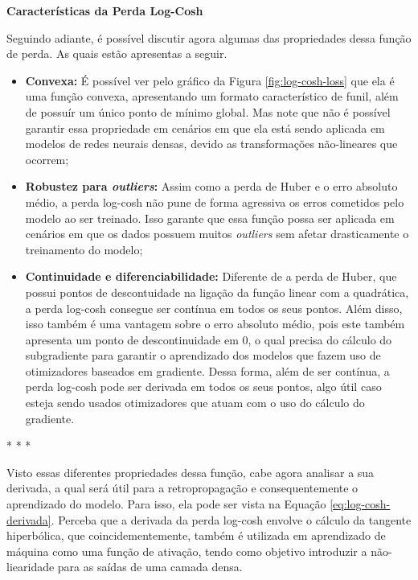 \textbf{Características da Perda Log-Cosh}
\vspace{1em}

Seguindo adiante, é possível discutir agora algumas das propriedades dessa função de perda. As quais estão apresentas a seguir.

\begin{itemize}
    \item \textbf{Convexa:} É possível ver pelo gráfico da Figura \ref{fig:log-cosh-loss} que ela é uma função convexa, apresentando um formato característico de funil, além de possuír um único ponto de mínimo global. Mas note que não é possível garantir essa propriedade em cenários em que ela está sendo aplicada em modelos de redes neurais densas, devido as transformações não-lineares que ocorrem;
    \item \textbf{Robustez para \textit{outliers}:} Assim como a perda de Huber e o erro absoluto médio, a perda log-cosh não pune de forma agressiva os erros cometidos pelo modelo ao ser treinado. Isso garante que essa função possa ser aplicada em cenários em que os dados possuem muitos \textit{outliers} sem afetar drasticamente o treinamento do modelo;
    \item \textbf{Continuidade e diferenciabilidade:} Diferente de a perda de Huber, que possui pontos de descontuidade na ligação da função linear com a quadrática, a perda log-cosh consegue ser contínua em todos os seus pontos. Além disso, isso também é uma vantagem sobre o erro absoluto médio, pois este também apresenta um ponto de descontinuidade em 0, o qual precisa do cálculo do subgradiente para garantir o aprendizado dos modelos que fazem uso de otimizadores baseados em gradiente. Dessa forma, além de ser contínua, a perda log-cosh pode ser derivada em todos os seus pontos, algo útil caso esteja sendo usados otimizadores que atuam com o uso do cálculo do gradiente.
\end{itemize}

\medskip
\begin{center}
 * * *
\end{center}
\medskip

Visto essas diferentes propriedades dessa função, cabe agora analisar a sua derivada, a qual será útil para a retropropagação e consequentemente o aprendizado do modelo. Para isso, ela pode ser vista na Equação \ref{eq:log-cosh-derivada}. Perceba que a derivada da perda log-cosh envolve o cálculo da tangente hiperbólica, que coincidementemente, também é utilizada em aprendizado de máquina como uma função de ativação, tendo como objetivo introduzir a não-liearidade para as saídas de uma camada densa.

